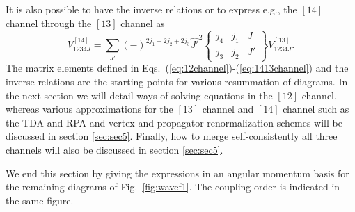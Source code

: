 \documentclass[twoside,12pt]{article}
\begin{document}
It is also possible to have the inverse relations or to express
e.g., the $[14]$ channel through the $[13]$ channel as
\begin{equation}
       V_{1234J}^{[14]}=
      {\displaystyle \sum_{J'}}(-)^{2j_1+2j_2+2j_3}\hat{J'}^2
      \left\{
      \begin{array}{ccc}
       j_4&j_1&J\\j_3&j_2&J'
      \end{array}
       \right\}
       V_{1234J}^{[13]}.
       \label{eq:1413channel}
\end{equation}
The matrix elements defined in Eqs.\
(\ref{eq:12channel})-(\ref{eq:1413channel}) and the inverse relations
are the
starting points for various resummation of diagrams.
In the next section we will detail ways of solving equations
in the $[12]$ channel, whereas various approximations for the
$[13]$ channel and $[14]$ channel such as the TDA and RPA
and  vertex and propagator renormalization schemes
will be discussed in section \ref{sec:sec5}. Finally, how to
merge self-consistently  all three channels will also be discussed
in section \ref{sec:sec5}.

We end this section by giving the expressions in an angular momentum
basis for the remaining
diagrams of Fig.\ \ref{fig:wavef1}. The coupling order is indicated
in the same figure.
\end{document}
